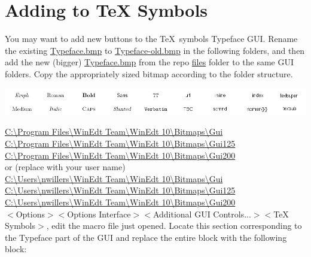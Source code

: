 \section{Adding to TeX Symbols }
You may want to add new buttons to the \TeX\ symbols Typeface GUI.
Rename the existing \url{Typeface.bmp} to \url{Typeface-old.bmp} in the following folders, and then add the new (bigger) \url{Typeface.bmp} from the repo \url{files} folder to the same GUI folders. Copy the appropriately sized bitmap according to the folder structure.


\centerline{\includegraphics[bb= 0 0 999 88, width=\textwidth]{pic/Typeface.png}}

\noindent
\url{C:\Program Files\WinEdt Team\WinEdt 10\Bitmaps\Gui}\\
\url{C:\Program Files\WinEdt Team\WinEdt 10\Bitmaps\Gui125}\\
\url{C:\Program Files\WinEdt Team\WinEdt 10\Bitmaps\Gui200}\\
or (replace with your user name)\\
\url{C:\Users\nwillers\WinEdt Team\WinEdt 10\Bitmaps\Gui}\\
\url{C:\Users\nwillers\WinEdt Team\WinEdt 10\Bitmaps\Gui125}\\
\url{C:\Users\nwillers\WinEdt Team\WinEdt 10\Bitmaps\Gui200}\\



$<$Options$>$$<$Options Interface$>$$<$Additional GUI Controls...$>$$<$TeX Symbols$>$, edit the macro file just opened. Locate this section corresponding to the Typeface part of the GUI and replace the entire block with the following block:

